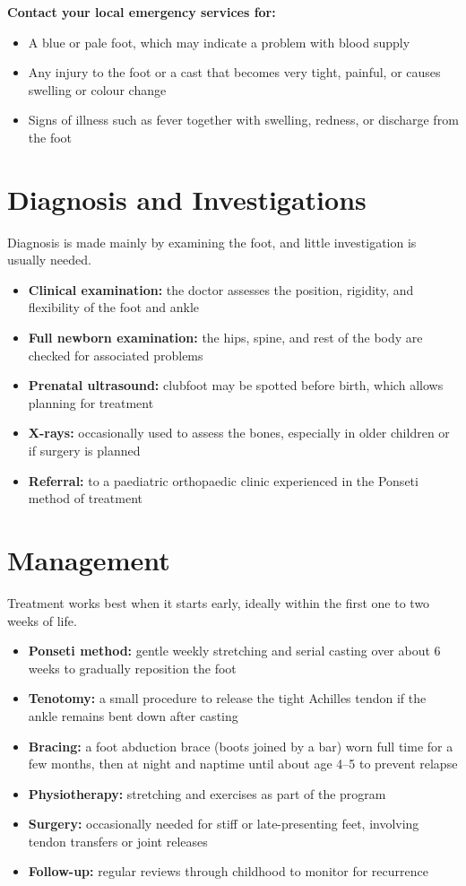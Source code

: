 \textbf{Contact your local emergency services for:}
\begin{itemize}
    \item A blue or pale foot, which may indicate a problem with blood supply
    \item Any injury to the foot or a cast that becomes very tight, painful, or causes swelling or colour change
    \item Signs of illness such as fever together with swelling, redness, or discharge from the foot
\end{itemize}

\section*{Diagnosis and Investigations}
Diagnosis is made mainly by examining the foot, and little investigation is usually needed.
\begin{itemize}
    \item \textbf{Clinical examination:} the doctor assesses the position, rigidity, and flexibility of the foot and ankle
    \item \textbf{Full newborn examination:} the hips, spine, and rest of the body are checked for associated problems
    \item \textbf{Prenatal ultrasound:} clubfoot may be spotted before birth, which allows planning for treatment
    \item \textbf{X-rays:} occasionally used to assess the bones, especially in older children or if surgery is planned
    \item \textbf{Referral:} to a paediatric orthopaedic clinic experienced in the Ponseti method of treatment
\end{itemize}

\section*{Management}
Treatment works best when it starts early, ideally within the first one to two weeks of life.
\begin{itemize}
    \item \textbf{Ponseti method:} gentle weekly stretching and serial casting over about 6 weeks to gradually reposition the foot
    \item \textbf{Tenotomy:} a small procedure to release the tight Achilles tendon if the ankle remains bent down after casting
    \item \textbf{Bracing:} a foot abduction brace (boots joined by a bar) worn full time for a few months, then at night and naptime until about age 4--5 to prevent relapse
    \item \textbf{Physiotherapy:} stretching and exercises as part of the program
    \item \textbf{Surgery:} occasionally needed for stiff or late-presenting feet, involving tendon transfers or joint releases
    \item \textbf{Follow-up:} regular reviews through childhood to monitor for recurrence
\end{itemize}

